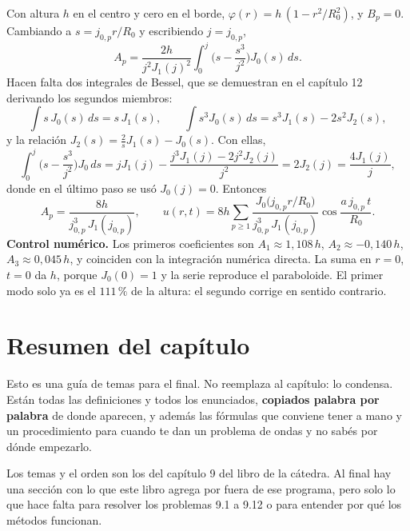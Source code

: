 \documentclass[
  spanish,
  a4paper,
]{scrbook}
\theoremstyle{definition}
\theoremstyle{plain}
\theoremstyle{definition}
\theoremstyle{plain}
\theoremstyle{definition}
\theoremstyle{remark}
\begin{document}
\begin{tcolorbox}[enhanced jigsaw, arc=.35mm, bottomrule=.15mm, bottomtitle=1mm, breakable, colback=white, colbacktitle=quarto-callout-tip-color!10!white, colframe=quarto-callout-tip-color-frame, coltitle=black, left=2mm, leftrule=.75mm, opacityback=0, opacitybacktitle=0.6, rightrule=.15mm, title=\textcolor{quarto-callout-tip-color}{\faLightbulb}\hspace{0.5em}{Solución}, titlerule=0mm, toprule=.15mm, toptitle=1mm]

Con altura \(h\) en el centro y cero en el borde,
\(\varphi(r) = h\,(1 - r^2/R_0^2)\), y \(B_p = 0\). Cambiando a
\(s = j_{0,p}r/R_0\) y escribiendo \(j = j_{0,p}\), \[
A_p = \frac{2h}{j^2J_1(j)^2}\int_0^{j}\Big(s - \frac{s^3}{j^2}\Big)J_0(s)\,ds .
\] Hacen falta dos integrales de Bessel, que se demuestran en el
capítulo 12 derivando los segundos miembros: \[
\int s\,J_0(s)\,ds = s\,J_1(s), \qquad \int s^3J_0(s)\,ds = s^3J_1(s) - 2s^2J_2(s),
\] y la relación \(J_2(s) = \tfrac2sJ_1(s) - J_0(s)\). Con ellas, \[
\int_0^{j}\Big(s - \frac{s^3}{j^2}\Big)J_0\,ds = jJ_1(j) - \frac{j^3J_1(j) - 2j^2J_2(j)}{j^2} = 2J_2(j) = \frac{4J_1(j)}{j},
\] donde en el último paso se usó \(J_0(j) = 0\). Entonces \[
A_p = \frac{8h}{j_{0,p}^3\,J_1(j_{0,p})},\qquad
u(r,t) = 8h\sum_{p\ge1}\frac{J_0\big(j_{0,p}r/R_0\big)}{j_{0,p}^3\,J_1(j_{0,p})}\cos\frac{a\,j_{0,p}\,t}{R_0}.
\] \textbf{Control numérico.} Los primeros coeficientes son
\(A_1\approx1{,}108\,h\), \(A_2\approx-0{,}140\,h\),
\(A_3\approx0{,}045\,h\), y coinciden con la integración numérica
directa. La suma en \(r=0\), \(t=0\) da \(h\), porque \(J_0(0) = 1\) y
la serie reproduce el paraboloide. El primer modo solo ya es el
\(111\,\%\) de la altura: el segundo corrige en sentido contrario.

\end{tcolorbox}

\section{Resumen del capítulo}\label{sec-hip-resumen}

Esto es una guía de temas para el final. No reemplaza al capítulo: lo
condensa. Están todas las definiciones y todos los enunciados,
\textbf{copiados palabra por palabra} de donde aparecen, y además las
fórmulas que conviene tener a mano y un procedimiento para cuando te dan
un problema de ondas y no sabés por dónde empezarlo.

Los temas y el orden son los del capítulo 9 del libro de la cátedra. Al
final hay una sección con lo que este libro agrega por fuera de ese
programa, pero solo lo que hace falta para resolver los problemas 9.1 a
9.12 o para entender por qué los métodos funcionan.
\end{document}
